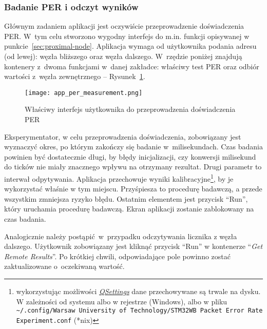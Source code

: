 \subsubsection{Badanie PER i odczyt wyników}
Głównym zadaniem aplikacji jest oczywiście przeprowadzenie doświadczenia PER. W~tym celu
stworzono wygodny interfejs do m.in. funkcji opisywanej w punkcie~\ref{sec:proximal-node}.
Aplikacja wymaga od użytkownika podania adresu (od lewej): węzła bliższego oraz
węzła dalszego. W~rzędzie poniżej znajdują kontenery z~dwoma funkcjami w~danej zakładce:
właściwy test PER oraz odbiór wartości z~węzła zewnętrznego -- Rysunek~\ref{app_per_measurement}.
 
\begin{figure}[!ht]
	\centering \texttt{[image: app\_per\_measurement.png]}
	\caption{Właściwy interfejs użytkownika do przeprowadzenia doświadczenia PER}
	\label{app_per_measurement}
\end{figure}

Eksperymentator, w celu przeprowadzenia doświadczenia, zobowiązany jest wyznaczyć okres, po 
którym zakończy się badanie w~milisekundach. Czas badania powinien być dostatecznie
długi, by błędy inicjalizacji, czy konwersji milisekund do ticków nie miały znacznego wpływu
na otrzymany rezultat. Drugi parametr to interwał odpytywania. Aplikacja przechowuje
wyniki kalibracyjne\footnote{wykorzystując możliwości \href{https://doc.qt.io/qt-5/qsettings.html}{\textit{QSettings}}
dane przechowywane są trwale na dysku. W zależności od systemu albo w rejestrze (Windows),
albo w pliku \texttt{\textasciitilde{}/.config/Warsaw University of Technology/STM32WB Packet Error Rate Experiment.conf} (*nix)},
by je wykorzystać właśnie w tym miejscu. Przyśpiesza to procedurę badawczą, a przede wszystkim
zmniejsza ryzyko błędu. Ostatnim elementem jest przycisk \enquote{Run}, który uruchamia procedurę
badawczą. Ekran aplikacji zostanie zablokowany na czas badania.

Analogicznie należy postąpić w~przypadku odczytywania licznika z węzła dalszego. Użytkownik
zobowiązany jest kliknąć przycisk \enquote{Run} w kontenerze \enquote{\textit{Get Remote Results}}.
Po krótkiej chwili, odpowiadające pole powinno zostać zaktualizowane o~oczekiwaną wartość.



